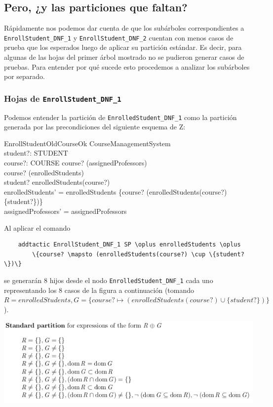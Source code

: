 \documentclass{article}
\begin{document}
\subsection*{Pero, ¿y las particiones que faltan?}

Rápidamente nos podemos dar cuenta de que los subárboles correspondientes a \verb|EnrollStudent_DNF_1| y \verb|EnrollStudent_DNF_2| cuentan con menos casos de prueba que los esperados luego de aplicar su partición estándar. Es decir, para algunas de las hojas del primer árbol mostrado no se pudieron generar casos de pruebas. Para entender por qué sucede esto procedemos a analizar los subárboles por separado.

\subsubsection*{Hojas de \texttt{EnrollStudent\_DNF\_1}}

Podemos entender la partición de \verb|EnrolledStudent_DNF_1| como la partición generada por las precondiciones del siguiente esquema de Z:

\begin{schema}{EnrollStudentOldCourseOk}
    \Delta CourseManagementSystem \\
    student?: STUDENT \\
    course?: COURSE
    \where
    course? \in \dom(assignedProfessors) \\
    course? \in \dom(enrolledStudents) \\
    student? \notin enrolledStudents(course?) \\
    enrolledStudents' = enrolledStudents \oplus \{course? \mapsto (enrolledStudents(course?) \cup \{student?\})\} \\
    assignedProfessors' = assignedProfessors
\end{schema}

Al aplicar el comando 

\begin{verbatim}
    addtactic EnrollStudent_DNF_1 SP \oplus enrolledStudents \oplus 
        \{course? \mapsto (enrolledStudents(course?) \cup \{student?\})\}
\end{verbatim}

se generarán 8 hijos desde el nodo \verb|EnrolledStudent_DNF_1| cada uno representando los 8 casos de la figura a continuación (tomando $R = enrolledStudents, G = \{course? \mapsto (enrolledStudents(course?) \cup \{student?\})\}$).

\begin{center}
    \includegraphics[scale=0.65]{particionoplus.png}
\end{center}
\end{document}

